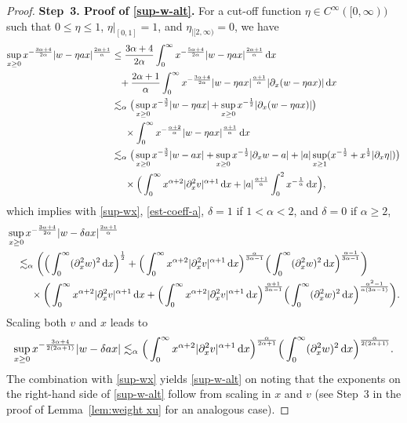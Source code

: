 \documentclass[reqno,12pt]{amsart}
\renewcommand{\d}{\ensuremath{\mathrm{d}}}
\renewcommand{\d}{\ensuremath{{\rm d}}}
\numberwithin{equation}{section}
\begin{document}
\begin{proof}
%
\bigskip
%

\noindent\textbf{Step~3. Proof of \eqref{sup-w-alt}.}
For a cut-off function $\eta \in C^\infty([0,\infty))$ such that $0 \le \eta \le 1$, $\eta|_{[0,1]} = 1$, and $\eta_{|[2,\infty)} = 0$, we have
%
\begin{align*}
\sup_{x \ge 0} x^{- \frac{3\alpha+4}{2\alpha}} |w-\eta a x|^{\frac{2\alpha+1}{\alpha}} 
&\leq \frac{3\alpha+4}{2\alpha} \int_0^\infty x^{- \frac{5\alpha+4}{2\alpha}} |w-\eta a x|^{\frac{2\alpha+1}{\alpha}} \, \d x \\
&\phantom{\lesssim} + \frac{2\alpha+1}{\alpha} \int_0^\infty x^{- \frac{3\alpha+4}{2\alpha}} |w-\eta a x|^{\frac{\alpha+1}{\alpha}} |\partial_x (w - \eta a x)| \, \d x \\
&\lesssim_\alpha \big(\sup_{x \ge 0} x^{-\frac 3 2} |w-\eta ax| + \sup_{x \ge 0} x^{-\frac 1 2} |\partial_x (w - \eta a x)|\big) \\
&\phantom{\lesssim_\alpha} \times \int_0^\infty x^{- \frac{\alpha+2}{\alpha}} |w-\eta a x|^{\frac{\alpha+1}{\alpha}} \, \d x \\
&\lesssim_\alpha \big(\sup_{x \ge 0} x^{-\frac 3 2} |w- ax| + \sup_{x \ge 0} x^{-\frac 1 2} |\partial_x w - a| + |a| \sup_{x \ge 1} (x^{-\frac 1 2} + x^{\frac 1 2} |\partial_x \eta|)\big) \\
&\phantom{\lesssim_\alpha} \times \Big( \int_0^\infty x^{\alpha+2} |\partial_x^2 v|^{\alpha+1} \, \d x + |a|^{\frac{\alpha+1}{\alpha}} \int_0^2 x^{-\frac 1 \alpha} \, \d x \Big),
\end{align*}
%
which implies with \eqref{sup-wx}, \eqref{est-coeff-a}, $\delta = 1$ if $1 < \alpha < 2$, and $\delta = 0$ if $\alpha \ge 2$,
%
\begin{align*}
& \sup_{x \ge 0} x^{- \frac{3\alpha+4}{2\alpha}} |w - \delta a x|^{\frac{2\alpha+1}{\alpha}} \\
&\quad \lesssim_\alpha \bigg(\Big(\int_0^\infty (\partial_x^2 w)^2 \, \d x\Big)^{\frac 1 2} + \Big(\int_0^\infty x^{\alpha+2} |\partial_x^2 v|^{\alpha+1} \, \d x\Big)^{\frac{\alpha}{3\alpha-1}} \Big(\int_0^\infty (\partial_x^2 w)^2 \, \d x\Big)^{\frac{\alpha-1}{3\alpha-1}} \bigg) \\
& \quad \phantom{\lesssim_\alpha} \times \bigg(\int_0^\infty x^{\alpha+2} |\partial_x^2 v|^{\alpha+1} \, \d x  + \Big(\int_0^\infty x^{\alpha+2} |\partial_x^2 v|^{\alpha+1} \, \d x\Big)^{\frac{\alpha+1}{3\alpha-1}} \Big(\int_0^\infty (\partial_x^2 w)^2 \, \d x\Big)^{\frac{\alpha^2-1}{\alpha (3\alpha-1)}}\bigg).
\end{align*}
%
Scaling both $v$ and $x$ leads to
%
\[
\sup_{x \ge 0} x^{- \frac{3\alpha+4}{2 (2\alpha+1)}} |w - \delta a x| \lesssim_\alpha \Big(\int_0^\infty x^{\alpha+2} |\partial_x^2 v|^{\alpha+1} \, \d x\Big)^{\frac{\alpha}{2\alpha+1}} \Big(\int_0^\infty (\partial_x^2 w)^2 \, \d x\Big)^{\frac{\alpha}{2 (2\alpha+1)}}.
\]
%
The combination with \eqref{sup-wx} yields \eqref{sup-w-alt} on noting that the exponents on the right-hand side of \eqref{sup-w-alt} follow from scaling in $x$ and $v$ (see Step~3 in the proof of Lemma~\ref{lem:weight xu} for an analogous case).
\end{proof}
%
\end{document}
